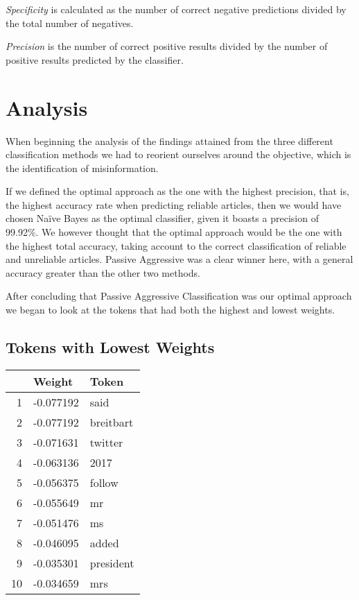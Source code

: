 \documentclass[12pt]{article}
\begin{document}
	\textit{Specificity} is calculated as the number of correct negative predictions divided by the total number of negatives.

	\textit{Precision} is the number of correct positive results divided by the number of positive results predicted by the classifier.

	\section{Analysis}

    When beginning the analysis of the findings attained from the three different classification methods we had to reorient ourselves around the objective, which is the identification of misinformation.

    If we defined the optimal approach as the one with the highest precision, that is, the highest accuracy rate when predicting reliable articles, then we would have chosen Naïve Bayes as the optimal classifier, given it boasts a precision of 99.92\%. We however thought that the optimal approach would be the one with the highest total accuracy, taking account to the correct classification of reliable and unreliable articles. Passive Aggressive was a clear winner here, with a general accuracy greater than the other two methods.

    After concluding that Passive Aggressive Classification was our optimal approach we began to look at the tokens that had both the highest and lowest weights.

    \subsection{Tokens with Lowest Weights}
	\begin{tabular}{r | l l}
		    & Weight        & Token         \\
		\hline
		1   & -0.077192     & said          \\
		2   & -0.077192	    & breitbart     \\
		3   & -0.071631     & twitter       \\
		4   & -0.063136	    & 2017          \\
		5   & -0.056375	    & follow        \\
		6   & -0.055649	    & mr            \\
		7   & -0.051476	    & ms            \\
		8   & -0.046095	    & added         \\
		9   & -0.035301	    & president     \\
		10  & -0.034659     & mrs           \\
	\end{tabular}
\end{document}
